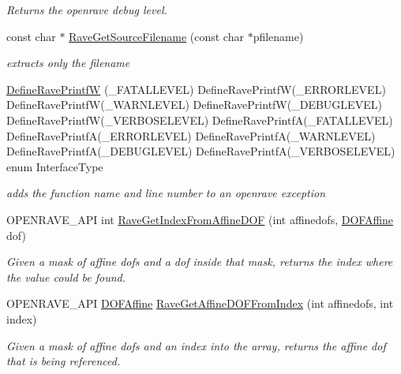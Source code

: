 \begin{DoxyCompactItemize}
\begin{DoxyCompactList}\small\item\em Returns the openrave debug level. \item\end{DoxyCompactList}\item 
\hypertarget{namespaceOpenRAVE_a49875f4e0a05692a85b7b6b37113d4cc}{
const char $\ast$ \hyperlink{namespaceOpenRAVE_a49875f4e0a05692a85b7b6b37113d4cc}{RaveGetSourceFilename} (const char $\ast$pfilename)}
\label{namespaceOpenRAVE_a49875f4e0a05692a85b7b6b37113d4cc}

\begin{DoxyCompactList}\small\item\em extracts only the filename \item\end{DoxyCompactList}\item 
\hyperlink{namespaceOpenRAVE_a15759460275c5fa586f4ca9656d998b9}{DefineRavePrintfW} (\_\-FATALLEVEL) DefineRavePrintfW(\_\-ERRORLEVEL) DefineRavePrintfW(\_\-WARNLEVEL) DefineRavePrintfW(\_\-DEBUGLEVEL) DefineRavePrintfW(\_\-VERBOSELEVEL) DefineRavePrintfA(\_\-FATALLEVEL) DefineRavePrintfA(\_\-ERRORLEVEL) DefineRavePrintfA(\_\-WARNLEVEL) DefineRavePrintfA(\_\-DEBUGLEVEL) DefineRavePrintfA(\_\-VERBOSELEVEL) enum InterfaceType
\begin{DoxyCompactList}\small\item\em adds the function name and line number to an openrave exception \item\end{DoxyCompactList}\item 
OPENRAVE\_\-API int \hyperlink{namespaceOpenRAVE_a5d7ef493cc8ed7bf8a4602cda1468466}{RaveGetIndexFromAffineDOF} (int affinedofs, \hyperlink{namespaceOpenRAVE_a3016e2185103f3c1bdc5e4482893ca98}{DOFAffine} dof)
\begin{DoxyCompactList}\small\item\em Given a mask of affine dofs and a dof inside that mask, returns the index where the value could be found. \item\end{DoxyCompactList}\item 
OPENRAVE\_\-API \hyperlink{namespaceOpenRAVE_a3016e2185103f3c1bdc5e4482893ca98}{DOFAffine} \hyperlink{namespaceOpenRAVE_adf2141071a66cfbcbe55a64ade70e9d8}{RaveGetAffineDOFFromIndex} (int affinedofs, int index)
\begin{DoxyCompactList}\small\item\em Given a mask of affine dofs and an index into the array, returns the affine dof that is being referenced. \item\end{DoxyCompactList}\item 

\end{DoxyCompactItemize}
